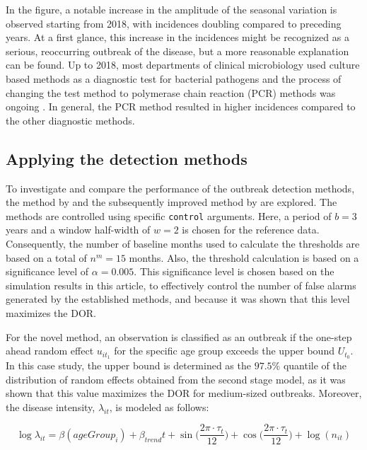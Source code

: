 \documentclass[preprint, 3p, authoryear]{elsarticle} %
\begin{document}
In the figure, a notable increase in the amplitude of the seasonal variation is observed starting from 2018, with incidences doubling compared to preceding years. At a first glance, this increase in the incidences might be recognized as a serious, reoccurring outbreak of the disease, but a more reasonable explanation can be found. Up to 2018, most departments of clinical microbiology used culture based methods as a diagnostic test for bacterial pathogens and the process of changing the test method to polymerase chain reaction (PCR) methods was ongoing \citep{Svendsen_2023}. In general, the PCR method resulted in higher incidences compared to the other diagnostic methods.

\hypertarget{applying-the-detection-methods}{%
\subsection{Applying the detection methods}\label{applying-the-detection-methods}}

To investigate and compare the performance of the outbreak detection methods, the method by \citet{Farrington_1996} and the subsequently improved method by \citet{Noufaily_2013} are explored. The methods are controlled using specific \texttt{control} arguments. Here, a period of \(b=3\) years and a window half-width of \(w=2\) is chosen for the reference data. Consequently, the number of baseline months used to calculate the thresholds are based on a total of \(n^{m}=15\) months. Also, the threshold calculation is based on a significance level of \(\alpha=0.005\). This significance level is chosen based on the simulation results in this article, to effectively control the number of false alarms generated by the established methods, and because it was shown that this level maximizes the DOR.

For the novel method, an observation is classified as an outbreak if the one-step ahead random effect \(u_{it_1}\) for the specific age group exceeds the upper bound \(U_{t_0}\). In this case study, the upper bound is determined as the \(97.5\%\) quantile of the distribution of random effects obtained from the second stage model, as it was shown that this value maximizes the DOR for medium-sized outbreaks. Moreover, the disease intensity, \(\lambda_{it}\), is modeled as follows:

\begin{equation}
  \log{\lambda_{it}}=\beta(ageGroup_i) + \beta_{trend} t + \sin\big(\frac{2\pi\cdot\tau_t}{12}\big) + \cos \big(\frac{2\pi\cdot\tau_t}{12}\big) + \log(n_{it})
\end{equation}
\end{document}
